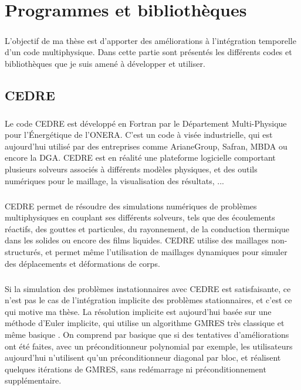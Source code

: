 \chapter{Programmes et bibliothèques}

\paragraph{}
L'objectif de ma thèse est d'apporter des améliorations à l'intégration temporelle d'un code multiphysique.
Dans cette partie sont présentés les différents codes et bibliothèques que je suis amené à développer et utiliser.

\section{CEDRE}

  \paragraph{}
  Le code CEDRE est développé en Fortran par le Département Multi-Physique pour l'Énergétique de l'ONERA.
  C'est un code à visée industrielle, qui est aujourd'hui utilisé par des entreprises comme ArianeGroup, Safran, MBDA ou encore la DGA.
  CEDRE est en réalité une plateforme logicielle comportant plusieurs solveurs associés à différents modèles physiques, et des outils numériques pour le maillage, la visualisation des résultats, ...

  \paragraph{}
  CEDRE permet de résoudre des simulations numériques de problèmes multiphysiques en couplant ses différents solveurs, tels que des écoulements réactifs, des gouttes et particules, du rayonnement, de la conduction thermique dans les solides ou encore des films liquides.
  CEDRE utilise des maillages non-structurés, et permet même l'utilisation de maillages dynamiques pour simuler des déplacements et déformations de corps.

  \paragraph{}
  Si la simulation des problèmes instationnaires avec CEDRE est satisfaisante, ce n'est pas le cas de l'intégration implicite des problèmes stationnaires, et c'est ce qui motive ma thèse.
  La résolution implicite est aujourd'hui basée sur une méthode d'Euler implicite, qui utilise un algorithme GMRES très classique et même basique \cite{Selva1998}.
  On comprend par basique que si des tentatives d'améliorations ont été faites, avec un préconditionneur polynomial par exemple, les utilisateurs aujourd'hui n'utilisent qu'un préconditionneur diagonal par bloc, et réalisent quelques itérations de GMRES, sans redémarrage ni préconditionnement supplémentaire.

